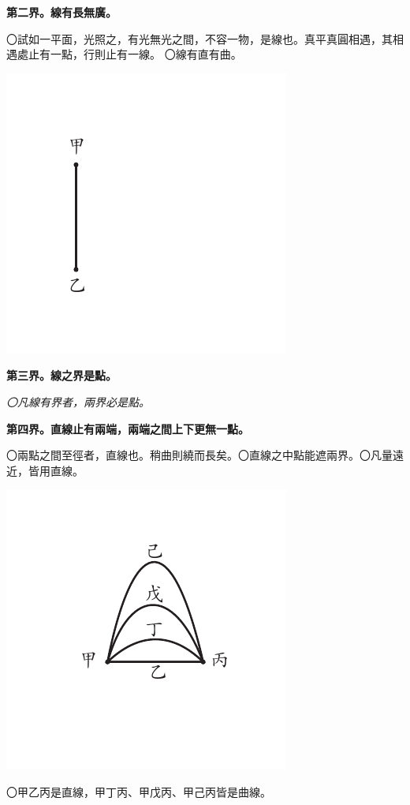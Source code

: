 \documentclass[12pt,b5paper,landscape]{article}
\newcommand{\ccom}[1]{{\footnotesize \emph{〇#1}}}
\newcommand{\bcom}[1]{〇#1}
\newcommand{\cthm}[1]{{
\vspace{8pt}

\bfseries #1}}
\begin{document}
\begin{multicols}{2}
\cthm{第二界。線有長無廣。}\bcom{試如一平面，光照之，有光無光之間，不容一物，是線也。真平真圓相遇，其相遇處止有一點，行則止有一線。}
\bcom{線有直有曲。}
\begin{center}
\includegraphics[angle=90]{eu2}
\end{center}

\cthm{第三界。線之界是點。}\ccom{凡線有界者，兩界必是點。}

\cthm{第四界。直線止有兩端，兩端之間上下更無一點。}\bcom{兩點之間至徑者，直線也。稍曲則繞而長矣。}\bcom{直線之中點能遮兩界。}\bcom{凡量遠近，皆用直線。}
\begin{center}
\includegraphics[angle=90]{eu3}
\end{center}
\bcom{甲乙丙是直線，甲丁丙、甲戊丙、甲己丙皆是曲線。}


\end{multicols}
\end{document}
